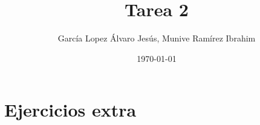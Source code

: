 \documentclass[11pt]{article}
\title{Tarea 2}
\author{García Lopez Álvaro Jesús, Munive Ramírez Ibrahim}
\date{\today}
\begin{document}














\section*{Ejercicios extra}




\end{document}
